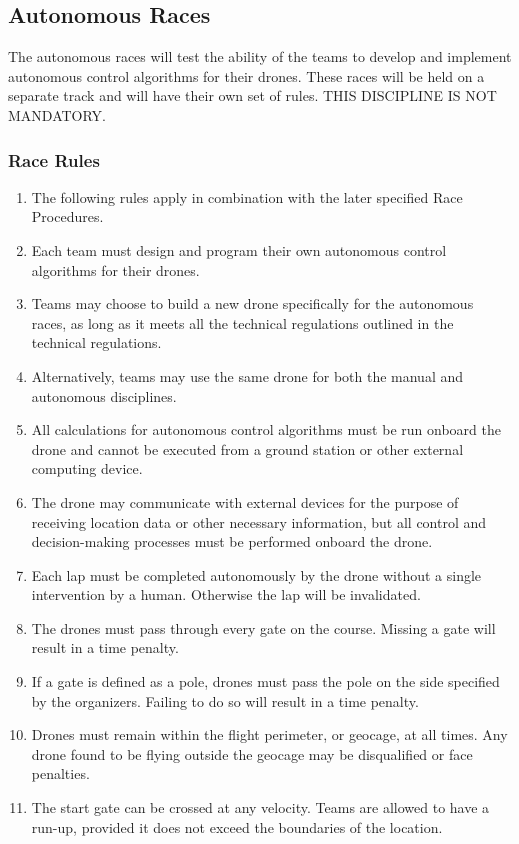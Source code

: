     \subsection{Autonomous Races}
    The autonomous races will test the ability of the teams to develop and implement autonomous control algorithms for their drones. These races will be held on a separate track and will have their own set of rules. THIS DISCIPLINE IS NOT MANDATORY.

    \subsubsection{Race Rules}
    \begin{enumerate}
    \item The following rules apply in combination with the later specified Race Procedures.
    \item Each team must design and program their own autonomous control algorithms for their drones.
    \item Teams may choose to build a new drone specifically for the autonomous races, as long as it meets all the technical regulations outlined in the technical regulations.
    \item Alternatively, teams may use the same drone for both the manual and autonomous disciplines.
    \item All calculations for autonomous control algorithms must be run onboard the drone and cannot be executed from a ground station or other external computing device.
    \item The drone may communicate with external devices for the purpose of receiving location data or other necessary information, but all control and decision-making processes must be performed onboard the drone.
    \item Each lap must be completed autonomously by the drone without a single intervention by a human. Otherwise the lap will be invalidated.
    \item The drones must pass through every gate on the course. Missing a gate will result in a time penalty.
    \item If a gate is defined as a pole, drones must pass the pole on the side specified by the organizers. Failing to do so will result in a time penalty.
    \item Drones must remain within the flight perimeter, or geocage, at all times. Any drone found to be flying outside the geocage may be disqualified or face penalties.
    \item The start gate can be crossed at any velocity. Teams are allowed to have a run-up, provided it does not exceed the boundaries of the location.

\end{enumerate}
